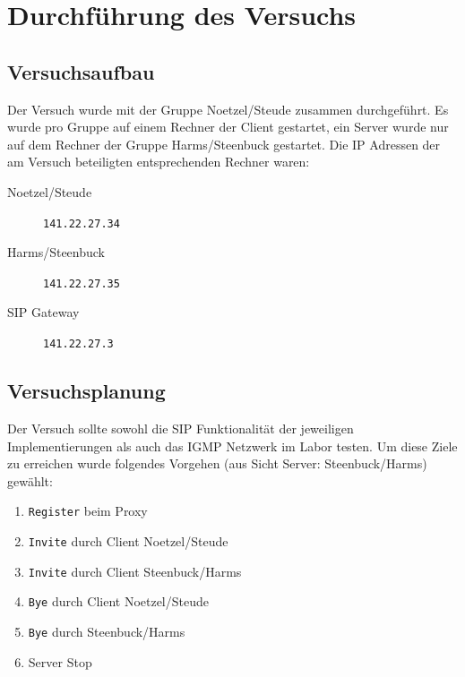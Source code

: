 \documentclass[10pt]{scrartcl}
\author{André Harms, Oliver Steenbuck}
\title{\titletext}
\date{04.01.2012}
\begin{document}
\maketitle

\setcounter{tocdepth}{3}
\tableofcontents


\section{Durchführung des Versuchs}

\subsection{Versuchsaufbau}\label{subsec:versuchsaufbau}
Der Versuch wurde mit der Gruppe Noetzel/Steude zusammen durchgeführt.
Es wurde pro Gruppe auf einem Rechner der Client gestartet, ein Server wurde nur auf dem Rechner der Gruppe Harms/Steenbuck gestartet. Die IP Adressen der am Versuch beteiligten entsprechenden Rechner waren:
\begin{description}
	\item[Noetzel/Steude] \verb!141.22.27.34!
	\item[Harms/Steenbuck] \verb!141.22.27.35!
	\item[SIP Gateway] \verb!141.22.27.3!
\end{description}

\subsection{Versuchsplanung} \label{subsec:versuchplanung}
Der Versuch sollte sowohl die SIP Funktionalität der jeweiligen Implementierungen als auch das IGMP Netzwerk im Labor testen. Um diese Ziele zu erreichen wurde folgendes Vorgehen (aus Sicht Server: Steenbuck/Harms) gewählt:

\begin{enumerate}
	\item \verb!Register! beim Proxy
	\item \verb!Invite! durch Client Noetzel/Steude
	\item \verb!Invite! durch Client Steenbuck/Harms
	\item \verb!Bye! durch Client Noetzel/Steude
	\item \verb!Bye! durch Steenbuck/Harms
	\item Server Stop
\end{enumerate}
\end{document}
